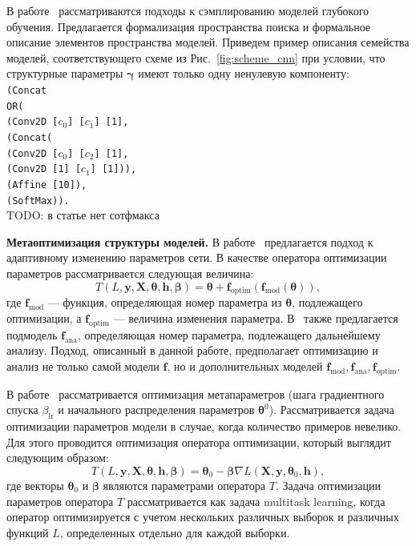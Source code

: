 В работе~\cite{search_space} рассматриваются подходы к сэмплированию моделей глубокого обучения. Предлагается формализация пространства поиска и формальное описание элементов  пространства моделей. Приведем пример описания семейства моделей, соответствующего схеме из Рис.~\ref{fig:scheme_cnn} при условии, что структурные параметры $\boldsymbol{\gamma}$ имеют только одну ненулевую компоненту:\\
\texttt{(Concat\\
\text{\quad}OR(\\
\text{\quad\quad}(Conv2D [$c_0$] [$c_1$] [1],\\
\text{\quad\quad}(Concat(\\
\text{\quad\quad\quad}(Conv2D [$c_0$] [$c_2$] [1],\\
\text{\quad\quad\quad}(Conv2D [1] [$c_1$] [1])),\\
\text{\quad}(Affine [10]),\\
\text{\quad}(SoftMax)).} \\
TODO: в статье нет сотфмакса

\par{\textbf{Метаоптимизация структуры моделей. }}
В работе~\cite{self_rnn} предлагается подход к адаптивному изменению параметров сети. В качестве оператора оптимизации параметров рассматривается следующая величина:
\[
    T(L, \mathbf{y}, \mathbf{X}, \boldsymbol{\theta}, \mathbf{h}, \boldsymbol{\beta}) = \boldsymbol{\theta} + \mathbf{f}_\text{optim}(\mathbf{f}_\text{mod}( \boldsymbol{\theta})),
\]
где $\mathbf{f}_\text{mod}$ --- функция, определяющая номер параметра из $\boldsymbol{\theta}$, подлежащего оптимизации, а $ \mathbf{f}_\text{optim}$ --- величина изменения параметра. 
В~\cite{self_rnn} также предлагается подмодель $\mathbf{f}_\text{ana}$, определяющая номер параметра, подлежащего дальнейшему анализу. Подход, описанный в данной работе, предполагает оптимизацию и анализ не только самой модели $\mathbf{f}$, но и дополнительных моделей $\mathbf{f}_\text{mod}, \mathbf{f}_\text{ana}, \mathbf{f}_\text{optim}$.

В работе~\cite{meta_sgd} рассматривается оптимизация метапараметров (шага градиентного спуска $\beta_{\text{lr}}$ и начального распределения параметров $\boldsymbol{\theta}^0$). Рассматривается задача оптимизации параметров модели в случае, когда количество примеров невелико. Для этого проводится оптимизация оператора оптимизации, который выглядит следующим образом:
\[
    T(L, \mathbf{y}, \mathbf{X}, \boldsymbol{\theta}, \mathbf{h}, \boldsymbol{\beta})  = \boldsymbol{\theta}_0 - \boldsymbol{\beta}\nabla L(\mathbf{X}, \mathbf{y},\boldsymbol{\theta}_0, \mathbf{h}),
\]
где векторы $\boldsymbol{\theta}_0$ и $\boldsymbol{\beta}$ являются параметрами оператора $T$. Задача оптимизации параметров оператора $T$ рассматривается как задача multitask learning, когда оператор оптимизируется с учетом нескольких различных выборок и различных функций $L$, определенных отдельно для каждой выборки.


